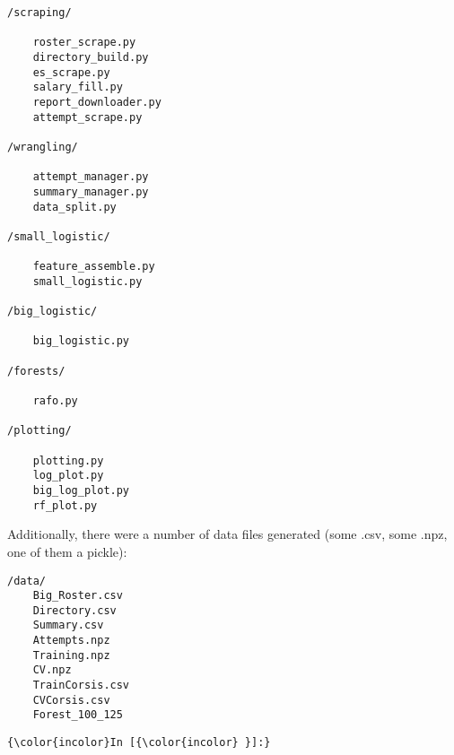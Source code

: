 \documentclass[11pt]{article}
\begin{document}
    \begin{verbatim}
/scraping/

    roster_scrape.py        
    directory_build.py      
    es_scrape.py            
    salary_fill.py          
    report_downloader.py        
    attempt_scrape.py       

/wrangling/

    attempt_manager.py      
    summary_manager.py      
    data_split.py           

/small_logistic/

    feature_assemble.py     
    small_logistic.py       

/big_logistic/

    big_logistic.py         

/forests/

    rafo.py          

/plotting/

    plotting.py          
    log_plot.py          
    big_log_plot.py          
    rf_plot.py          
\end{verbatim}

    Additionally, there were a number of data files generated (some .csv,
some .npz, one of them a pickle):

    \begin{verbatim}
/data/
    Big_Roster.csv
    Directory.csv
    Summary.csv
    Attempts.npz
    Training.npz
    CV.npz
    TrainCorsis.csv
    CVCorsis.csv
    Forest_100_125
\end{verbatim}

    \begin{Verbatim}[commandchars=\\\{\}]
{\color{incolor}In [{\color{incolor} }]:} 
\end{Verbatim}


    
    
    
    
\end{document}
